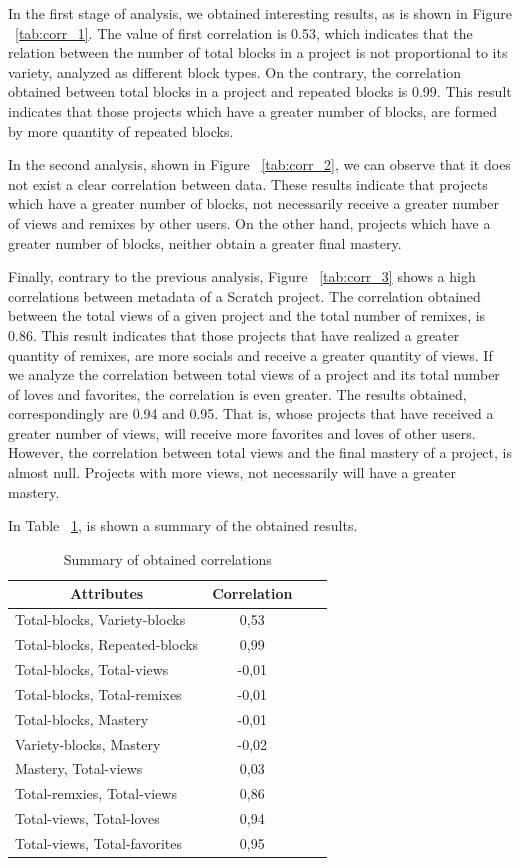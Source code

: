 \documentclass[a4paper,twocolumn,10pt]{article}
\begin{document}
In the first stage of analysis, we obtained interesting results, as is shown in
Figure ~\ref{tab:corr_1}. The value of first correlation is 0.53, which indicates that the 
relation between the number of total blocks in a project is not proportional
to its variety, analyzed as different block types. On the contrary, the
correlation obtained between total blocks in a project and repeated blocks is
0.99. This result indicates that those projects which have a greater number of 
blocks, are formed by more quantity of repeated blocks. \par
In the second analysis, shown in Figure ~\ref{tab:corr_2}, we can observe that it does not exist
a clear correlation between data. These results indicate that projects which have
a greater number of blocks, not necessarily receive a greater number of views and
remixes by other users. On the other hand, projects which have a greater number of
blocks, neither obtain a greater final mastery.\par
Finally, contrary to the previous analysis, Figure ~\ref{tab:corr_3} shows a high correlations 
between metadata of a Scratch project. The correlation obtained between the total
views of a given project and the total number of remixes, is 0.86. This result 
indicates that those projects that have realized a greater quantity of remixes,
are more socials and receive a greater quantity of views. If we analyze the 
correlation between total views of a project and its total number of loves and
favorites, the correlation is even greater. The results obtained, correspondingly
are 0.94 and 0.95. That is, whose projects that have received a greater number
of views, will receive more favorites and loves of other users. However, the
correlation between total views and the final mastery of a project, is almost
null. Projects with more views, not necessarily will have a greater mastery.\par
In Table ~\ref{tab:values}, is shown a summary of the obtained results.

\begin{table}
   \begin{tabular}{@{}lccc@{}}
    \toprule
    \multicolumn{1}{c}{\textbf{Attributes}} &\textbf{Correlation} \\
    \midrule
	Total-blocks, Variety-blocks & 0,53\\
        Total-blocks, Repeated-blocks & 0,99\\
        Total-blocks, Total-views & -0,01\\
        Total-blocks, Total-remixes & -0,01\\
        Total-blocks, Mastery & -0,01\\
        Variety-blocks, Mastery & -0,02 \\
        Mastery, Total-views & 0,03\\
        Total-remxies, Total-views & 0,86\\
        Total-views, Total-loves & 0,94\\
        Total-views, Total-favorites & 0,95\\
    \bottomrule
    \end{tabular}
    \caption{Summary of obtained correlations}
    \label{tab:values}
\end{table}
\end{document}
